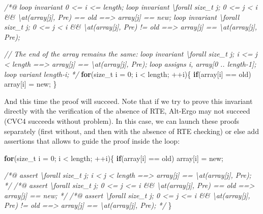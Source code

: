 \documentclass[12pt,francais,]{scrbook}
\newenvironment{Shaded}{}{}
\newcommand{\KeywordTok}[1]{\textcolor[rgb]{0.00,0.44,0.13}{\textbf{{#1}}}}
\newcommand{\DecValTok}[1]{\textcolor[rgb]{0.25,0.63,0.44}{{#1}}}
\newcommand{\CommentTok}[1]{\textcolor[rgb]{0.38,0.63,0.69}{\textit{{#1}}}}
\newcommand{\NormalTok}[1]{{#1}}
\begin{document}
\begin{footnotesize}\begin{Shaded}
\begin{Highlighting}[]
\CommentTok{/*@}
\CommentTok{  loop invariant 0 <= i <= length;}
\CommentTok{  loop invariant \textbackslash{}forall size_t j; 0 <= j < i && \textbackslash{}at(array[j], Pre) == old }
\CommentTok{                   ==> array[j] == new;}
\CommentTok{  loop invariant \textbackslash{}forall size_t j; 0 <= j < i && \textbackslash{}at(array[j], Pre) != old }
\CommentTok{                   ==> array[j] == \textbackslash{}at(array[j], Pre);}

\CommentTok{  // The end of the array remains the same:}
\CommentTok{  loop invariant \textbackslash{}forall size_t j; i <= j < length}
\CommentTok{                     ==> array[j] == \textbackslash{}at(array[j], Pre);}
\CommentTok{  loop assigns i, array[0 .. length-1];}
\CommentTok{  loop variant length-i;}
\CommentTok{*/}
\KeywordTok{for}\NormalTok{(size_t i = }\DecValTok{0}\NormalTok{; i < length; ++i)\{}
  \KeywordTok{if}\NormalTok{(array[i] == old) array[i] = new;}
\NormalTok{\}}
\end{Highlighting}
\end{Shaded}\end{footnotesize}

And this time the proof will succeed. Note that if we try to prove this
invariant directly with the verification of the absence of RTE, Alt-Ergo
may not succeed (CVC4 succeeds without problem). In this case, we can
launch these proofs separately (first without, and then with the absence
of RTE checking) or else add assertions that allows to guide the proof
inside the loop:

\begin{footnotesize}\begin{Shaded}
\begin{Highlighting}[]
\KeywordTok{for}\NormalTok{(size_t i = }\DecValTok{0}\NormalTok{; i < length; ++i)\{}
  \KeywordTok{if}\NormalTok{(array[i] == old) array[i] = new;}

  \CommentTok{/*@ assert \textbackslash{}forall size_t j; i < j < length }
\CommentTok{               ==> array[j] == \textbackslash{}at(array[j], Pre);                      */}
  \CommentTok{/*@ assert \textbackslash{}forall size_t j; 0 <= j <= i && \textbackslash{}at(array[j], Pre) == old }
\CommentTok{               ==> array[j] == new;                                     */}
  \CommentTok{/*@ assert \textbackslash{}forall size_t j; 0 <= j <= i && \textbackslash{}at(array[j], Pre) != old }
\CommentTok{               ==> array[j] == \textbackslash{}at(array[j], Pre);                      */}    
\NormalTok{\}}
\end{Highlighting}
\end{Shaded}\end{footnotesize}
\end{document}
